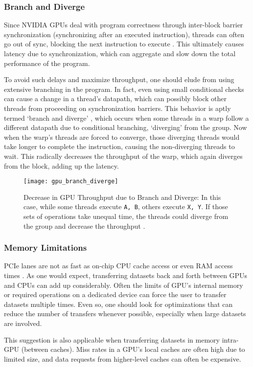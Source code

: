 \subsubsection{Branch and Diverge}
Since NVIDIA GPUs deal with program correctness through inter-block barrier synchronization (synchronizing after an executed instruction), threads can often go out of sync, blocking the next instruction to execute \cite[Appendix~B]{PattersonARM}. This ultimately causes latency due to synchronization, which can aggregate and slow down the total performance of the program.

To avoid such delays and maximize throughput, one should elude from using extensive branching in the program. In fact, even using small conditional checks can cause a change in a thread's datapath, which can possibly block other threads from proceeding on synchronization barriers. This behavior is aptly termed `branch and diverge' \cite{DemystifyingGPU} \cite[Appendix~B]{PattersonARM}, which occurs when some threads in a warp follow a different datapath due to conditional branching, `diverging' from the group. Now when the warp's threads are forced to converge, those diverging threads would take longer to complete the instruction, causing the non-diverging threads to wait. This radically decreases the throughput of the warp, which again diverges from the block, adding up the latency.
\begin{figure}[!htbp]
    \centering
    \texttt{[image: gpu\_branch\_diverge]}
    \caption[Decrease in GPU Throughput due to Branch and Diverge]{Decrease in GPU Throughput due to Branch and Diverge: In this case, while some threads execute \texttt{A, B}, others execute \texttt{X, Y}. If those sets of operations take unequal time, the threads could diverge from the group and decrease the throughput \cite{ParallelNVIDIA}.}
\end{figure}

\subsubsection{Memory Limitations}
PCIe lanes are not as fast as on-chip CPU cache access or even RAM access times \cite{CUDADocs,ParallelNVIDIA}. As one would expect, transferring datasets back and forth between GPUs and CPUs can add up considerably. Often the limits of GPU's internal memory or required operations on a dedicated device can force the user to transfer datasets multiple times. Even so, one should look for optimizations that can reduce the number of transfers whenever possible, especially when large datasets are involved.

This suggestion is also applicable when transferring datasets in memory intra-GPU (between caches). Miss rates in a GPU's local caches are often high due to limited size, and data requests from higher-level caches can often be expensive.